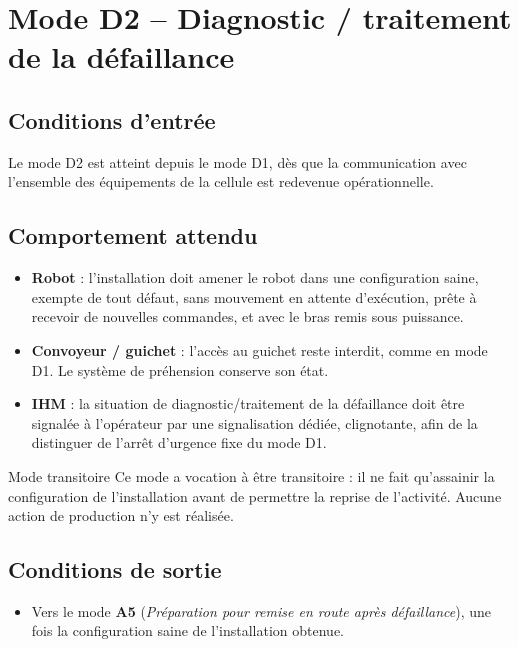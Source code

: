 \section{Mode D2 -- Diagnostic / traitement de la défaillance}
\label{secModeD2}

\subsection{Conditions d'entrée}

Le mode D2 est atteint depuis le mode D1, dès que la communication avec
l'ensemble des équipements de la cellule est redevenue opérationnelle.

\subsection{Comportement attendu}

\begin{itemize}
    \item \textbf{Robot} : l'installation doit amener le robot dans une
    configuration saine, exempte de tout défaut, sans mouvement en attente
    d'exécution, prête à recevoir de nouvelles commandes, et avec le bras
    remis sous puissance.
    \item \textbf{Convoyeur / guichet} : l'accès au guichet reste interdit,
    comme en mode D1. Le système de préhension conserve son état.
    \item \textbf{IHM} : la situation de diagnostic/traitement de la
    défaillance doit être signalée à l'opérateur par une signalisation
    dédiée, clignotante, afin de la distinguer de l'arrêt d'urgence fixe
    du mode D1.
\end{itemize}

\begin{UPSTIidee}{Mode transitoire}
Ce mode a vocation à être transitoire : il ne fait qu'assainir la
configuration de l'installation avant de permettre la reprise de
l'activité. Aucune action de production n'y est réalisée.
\end{UPSTIidee}

\subsection{Conditions de sortie}

\begin{itemize}
    \item Vers le mode \textbf{A5} (\emph{Préparation pour remise en route
    après défaillance}), une fois la configuration saine de l'installation
    obtenue.
\end{itemize}
